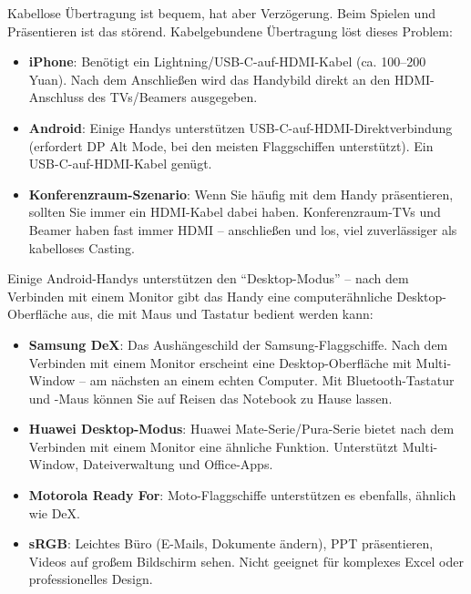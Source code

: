 
Kabellose Übertragung ist bequem, hat aber Verzögerung. Beim Spielen und Präsentieren ist das störend. Kabelgebundene Übertragung löst dieses Problem:

\begin{itemize}
  \item \textbf{iPhone}: Benötigt ein Lightning/USB-C-auf-HDMI-Kabel (ca. 100–200 Yuan). Nach dem Anschließen wird das Handybild direkt an den HDMI-Anschluss des TVs/Beamers ausgegeben.
  \item \textbf{Android}: Einige Handys unterstützen USB-C-auf-HDMI-Direktverbindung (erfordert DP Alt Mode, bei den meisten Flaggschiffen unterstützt). Ein USB-C-auf-HDMI-Kabel genügt.
  \item \textbf{Konferenzraum-Szenario}: Wenn Sie häufig mit dem Handy präsentieren, sollten Sie immer ein HDMI-Kabel dabei haben. Konferenzraum-TVs und Beamer haben fast immer HDMI – anschließen und los, viel zuverlässiger als kabelloses Casting.
\end{itemize}


Einige Android-Handys unterstützen den “Desktop-Modus” – nach dem Verbinden mit einem Monitor gibt das Handy eine computerähnliche Desktop-Oberfläche aus, die mit Maus und Tastatur bedient werden kann:

\begin{itemize}
  \item \textbf{Samsung DeX}: Das Aushängeschild der Samsung-Flaggschiffe. Nach dem Verbinden mit einem Monitor erscheint eine Desktop-Oberfläche mit Multi-Window – am nächsten an einem echten Computer. Mit Bluetooth-Tastatur und -Maus können Sie auf Reisen das Notebook zu Hause lassen.
  \item \textbf{Huawei Desktop-Modus}: Huawei Mate-Serie/Pura-Serie bietet nach dem Verbinden mit einem Monitor eine ähnliche Funktion. Unterstützt Multi-Window, Dateiverwaltung und Office-Apps.
  \item \textbf{Motorola Ready For}: Moto-Flaggschiffe unterstützen es ebenfalls, ähnlich wie DeX.
  \item \textbf{sRGB}: Leichtes Büro (E-Mails, Dokumente ändern), PPT präsentieren, Videos auf großem Bildschirm sehen. Nicht geeignet für komplexes Excel oder professionelles Design.
\end{itemize}

